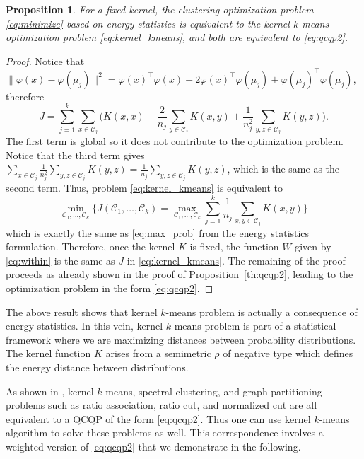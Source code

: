 \documentclass[aps,preprint,nofootinbib,floatfix]{revtex4-1}
\newtheorem{proposition}[theorem]{Proposition}
\newcommand\kk{K}
\newcommand\C{{\mathcal{C}}}
\begin{document}
\begin{proposition}
\label{th:kernel_kmeans}
For a fixed kernel,
the clustering optimization problem
\eqref{eq:minimize} based on energy statistics 
is equivalent to the kernel $k$-means optimization problem
\eqref{eq:kernel_kmeans}, and both are equivalent to \eqref{eq:qcqp2}.
\end{proposition}
\begin{proof}
Notice that $\| \varphi(x) - \varphi(\mu_j) \|^2 = \varphi(x)^\top \varphi(x)
- 2 \varphi(x)^\top \varphi(\mu_j) + \varphi(\mu_j)^\top \varphi(\mu_j)$,
therefore
\begin{equation}
\label{eq:J}
J = \sum_{j=1}^k \sum_{x\in\C_j} \bigg(
\kk(x,x) - 
\dfrac{2}{n_j} \sum_{y\in \C_j} \kk(x,y) + \dfrac{1}{n_j^2}
\sum_{y,z \in \C_j} \kk(y,z) \bigg).
\end{equation}
The first term is global so it does not contribute to the optimization
problem. Notice that the third term gives
$\sum_{x\in\C_j} \tfrac{1}{n_j^2} \sum_{y,z\in\C_j} \kk(y,z) =
\tfrac{1}{n_j}\sum_{y,z\in\C_j} \kk(y,z)$, which is the same as
the second term. Thus, problem
\eqref{eq:kernel_kmeans} is equivalent to
\begin{equation}
\min_{\C_1,\dotsc,\C_k} \bigg\{ J(\C_1,\dotsc,\C_k) = \max_{\C_1,\dotsc,\C_k}
\sum_{j=1}^k \dfrac{1}{n_j} \sum_{x,y \in\C_j} \kk(x,y) \bigg\}
\end{equation}
which is exactly the same as 
\eqref{eq:max_prob} from the energy statistics formulation. Therefore,
once the kernel $\kk$ is fixed, the function 
$W$ given by \eqref{eq:within} is the same
as $J$ in \eqref{eq:kernel_kmeans}.
The remaining of the proof proceeds as 
already shown in the proof of Proposition~\ref{th:qcqp2}, leading to
the optimization problem in the form \eqref{eq:qcqp2}.
\end{proof}

The above result shows that 
kernel $k$-means problem is actually a consequence
of energy statistics. In this vein, kernel $k$-means problem is part of a
statistical framework where we are maximizing distances between probability
distributions. The kernel function $\kk$ arises from a semimetric $\rho$ of
negative type which defines the energy distance between distributions.

As shown in \cite{Dhillon2,Dhillon}, kernel $k$-means, spectral clustering,
and graph partitioning problems such as ratio association, ratio cut, and
normalized cut are all equivalent to a QCQP of the form \eqref{eq:qcqp2}. Thus
one can use kernel $k$-means algorithm to solve these problems as well.
This correspondence involves a weighted version of \eqref{eq:qcqp2} that
we demonstrate in the following.
\end{document}
